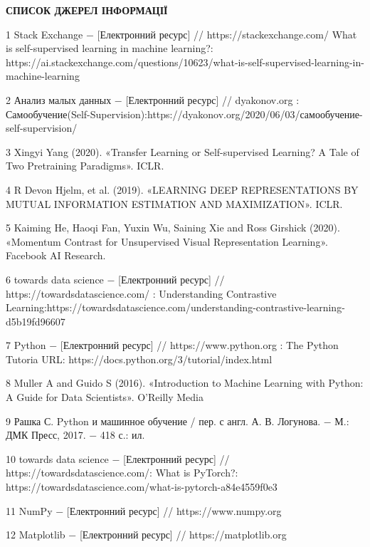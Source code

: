 \begin{center}
\textbf{СПИСОК ДЖЕРЕЛ ІНФОРМАЦІЇ}
\end{center}

1 Stack Exchange $-$ [Електронний ресурс] // https://stackexchange.com/ What is self-supervised learning in machine learning?: https://ai.stackexchange.com/questions/10623/what-is-self-supervised-learning-in-machine-learning

2 Анализ малых данных $-$ [Електронний ресурс] // dyakonov.org : Самообучение\hfill (Self-Supervision):\hfill https://dyakonov.org/2020/06/03/\newline самообучение-self-supervision/

3 Xingyi Yang (2020). «Transfer Learning or Self-supervised Learning? A Tale of Two Pretraining Paradigms». ICLR.

4 R Devon Hjelm, et al. (2019). «LEARNING DEEP REPRESENTATIONS BY MUTUAL INFORMATION ESTIMATION AND MAXIMIZATION». ICLR.

5 Kaiming He, Haoqi Fan, Yuxin Wu, Saining Xie and Ross Girshick (2020). «Momentum Contrast for Unsupervised Visual Representation Learning». Facebook AI Research.

6 towards data science $-$ [Електронний ресурс] // https://towardsdatascience.com/ : Understanding Contrastive Learning:\newline https://towardsdatascience.com/understanding-contrastive-learning-d5b19fd96607

7 Python $-$ [Електронний ресурс] // https://www.python.org :  The Python Tutoria URL: https://docs.python.org/3/tutorial/index.html

8 Muller A and Guido S (2016). «Introduction to Machine Learning with Python: A Guide for Data Scientists». O'Reilly Media

9 Рашка С. Python и машинное обучение / пер. с англ. А. В. Логунова. $-$ М.: ДМК Пресс, 2017. $-$ 418 с.: ил.

10 towards data science $-$ [Електронний ресурс]  // https://towardsdatascience.com/\newline : What is PyTorch?: https://towardsdatascience.com/what-is-pytorch-a84e4559f0e3

11 NumPy $-$ [Електронний ресурс] // https://www.numpy.org

12 Matplotlib $-$ [Електронний ресурс] // https://matplotlib.org

